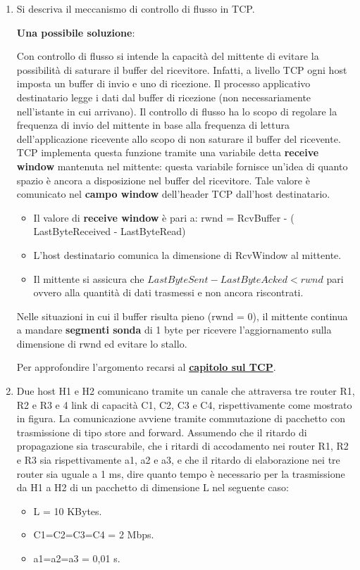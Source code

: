 \documentclass[11pt,a4paper,oneside]{book}
\theoremstyle{definition}
\begin{document}
\begin{enumerate}
	      \pagebreak

	\item Si descriva il meccanismo di controllo di flusso in
	      TCP.
	      \begin{flushleft}
		      \textbf{Una possibile soluzione}:
	      \end{flushleft}
	      Con controllo di flusso si intende  la capacità del mittente di evitare la possibilità di saturare il buffer del ricevitore. Infatti, a livello TCP ogni host imposta un buffer di invio e uno di ricezione. Il processo applicativo
	      destinatario legge i dati dal buffer di ricezione (non necessariamente nell'istante in cui arrivano). Il controllo di flusso ha lo scopo di regolare la frequenza di invio del mittente in base alla frequenza di lettura
	      dell'applicazione ricevente allo scopo di non saturare il buffer del ricevente.
	      TCP implementa questa funzione tramite una variabile detta \textbf{receive
		      window} mantenuta nel mittente: questa variabile fornisce un'idea di
	      quanto spazio è ancora a disposizione nel buffer del ricevitore. Tale valore
	      è comunicato nel \textbf{campo window} dell'header TCP dall’host destinatario.
	      \begin{itemize}
		      \item Il valore di \textbf{receive window} è pari a: \newline
		            rwnd = RcvBuffer - ( LastByteReceived - LastByteRead)
		      \item L'host destinatario comunica la dimensione di RcvWindow al mittente.
		      \item Il mittente si assicura che $LastByteSent - LastByteAcked < rwnd$ pari ovvero alla quantità di dati trasmessi e non ancora riscontrati.
	      \end{itemize}
	      Nelle situazioni in cui il buffer risulta pieno (rwnd = 0), il mittente
	      continua a mandare \textbf{segmenti sonda} di 1 byte per ricevere
	      l’aggiornamento sulla dimensione di rwnd ed evitare lo stallo.
	      \begin{flushleft}
		      Per approfondire l'argomento recarsi al \hyperref[sec:TCP]{\textbf{capitolo sul TCP}}.
	      \end{flushleft}
	\item Due host H1 e H2 comunicano tramite un canale che attraversa tre router R1, R2 e R3 e 4 link di capacità C1, C2, C3 e C4, rispettivamente come mostrato in figura.
	      La comunicazione avviene tramite commutazione di pacchetto con trasmissione di
	      tipo store and forward. Assumendo che il ritardo di propagazione sia trascurabile, che i ritardi di accodamento nei router R1, R2 e R3 sia rispettivamente a1, a2 e a3, e che il ritardo di elaborazione nei tre router sia uguale a 1 ms, dire quanto tempo è necessario per la trasmissione da H1 a H2 di un pacchetto di dimensione L nel
	      seguente caso:
	      \begin{itemize}
		      \item L = 10 KBytes.
		      \item C1=C2=C3=C4 = 2 Mbps.
		      \item a1=a2=a3 = 0,01 s.
	      \end{itemize}


\end{enumerate}
\end{document}
